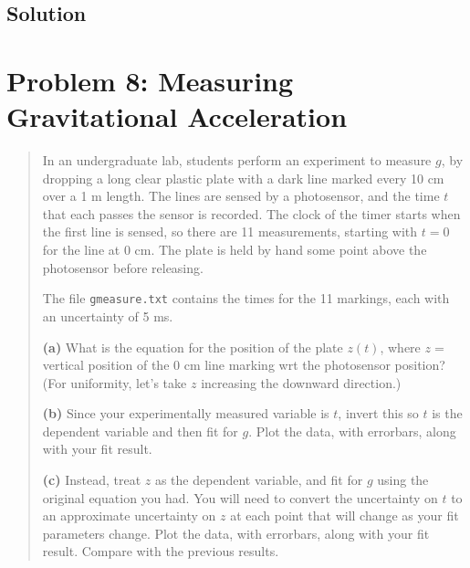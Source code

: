 \documentclass[11pt]{article}
\begin{document}
\subsection{Solution}


\section{Problem 8: Measuring Gravitational Acceleration}

\begin{quote}
    In an undergraduate lab, students perform an experiment to measure $g$, by dropping a long clear plastic plate with a dark line marked every 10 cm over a 1 m length. The lines are sensed by a photosensor, and the time $t$ that each passes the sensor is recorded. The clock of the timer starts when the first line is sensed, so there are 11 measurements, starting with $t = 0$ for the line at 0 cm. The plate is held by hand some point above the photosensor before releasing.

    The file \texttt{gmeasure.txt} contains the times for the 11 markings, each with an uncertainty of 5 ms.

    \textbf{(a)} What is the equation for the position of the plate $z(t)$, where $z =$ vertical position of the 0 cm line marking wrt the photosensor position? (For uniformity, let's take $z$ increasing the downward direction.)

    \textbf{(b)} Since your experimentally measured variable is $t$, invert this so $t$ is the dependent variable and then fit for $g$. Plot the data, with errorbars, along with your fit result.

    \textbf{(c)} Instead, treat $z$ as the dependent variable, and fit for $g$ using the original equation you had. You will need to convert the uncertainty on $t$ to an approximate uncertainty on $z$ at each point that will change as your fit parameters change. Plot the data, with errorbars, along with your fit result. Compare with the previous results.
\end{quote}
\end{document}
